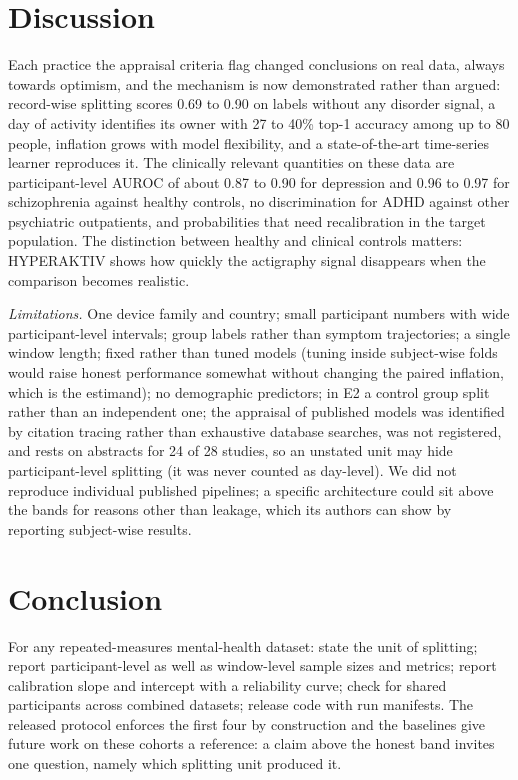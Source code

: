 \documentclass[journal]{IEEEtran}
\begin{document}
\section{Discussion}
Each practice the appraisal criteria flag changed conclusions on real data, always towards optimism, and the mechanism is now demonstrated rather than argued: record-wise splitting scores 0.69 to 0.90 on labels without any disorder signal, a day of activity identifies its owner with 27 to 40\% top-1 accuracy among up to 80 people, inflation grows with model flexibility, and a state-of-the-art time-series learner reproduces it. The clinically relevant quantities on these data are participant-level AUROC of about 0.87 to 0.90 for depression and 0.96 to 0.97 for schizophrenia against healthy controls, no discrimination for ADHD against other psychiatric outpatients, and probabilities that need recalibration in the target population. The distinction between healthy and clinical controls matters: HYPERAKTIV shows how quickly the actigraphy signal disappears when the comparison becomes realistic.

\emph{Limitations.} One device family and country; small participant numbers with wide participant-level intervals; group labels rather than symptom trajectories; a single window length; fixed rather than tuned models (tuning inside subject-wise folds would raise honest performance somewhat without changing the paired inflation, which is the estimand); no demographic predictors; in E2 a control group split rather than an independent one; the appraisal of published models was identified by citation tracing rather than exhaustive database searches, was not registered, and rests on abstracts for 24 of 28 studies, so an unstated unit may hide participant-level splitting (it was never counted as day-level). We did not reproduce individual published pipelines; a specific architecture could sit above the bands for reasons other than leakage, which its authors can show by reporting subject-wise results.

\section{Conclusion}
For any repeated-measures mental-health dataset: state the unit of splitting; report participant-level as well as window-level sample sizes and metrics; report calibration slope and intercept with a reliability curve; check for shared participants across combined datasets; release code with run manifests. The released protocol enforces the first four by construction and the baselines give future work on these cohorts a reference: a claim above the honest band invites one question, namely which splitting unit produced it.
\end{document}
